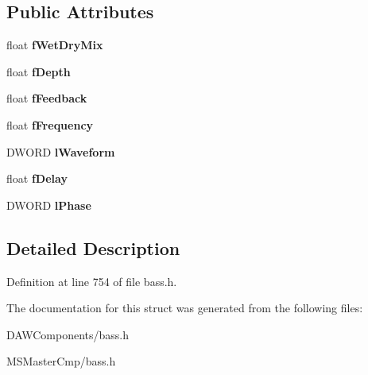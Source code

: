 \subsection*{Public Attributes}
\begin{DoxyCompactItemize}
\item 
\hypertarget{struct_b_a_s_s___d_x8___c_h_o_r_u_s_ade39ce1bf6ab4e1e4ae192491cf61dd9_ade39ce1bf6ab4e1e4ae192491cf61dd9}{float {\bfseries f\-Wet\-Dry\-Mix}}\label{struct_b_a_s_s___d_x8___c_h_o_r_u_s_ade39ce1bf6ab4e1e4ae192491cf61dd9_ade39ce1bf6ab4e1e4ae192491cf61dd9}

\item 
\hypertarget{struct_b_a_s_s___d_x8___c_h_o_r_u_s_a9255f6285c268622c30999d684e428f5_a9255f6285c268622c30999d684e428f5}{float {\bfseries f\-Depth}}\label{struct_b_a_s_s___d_x8___c_h_o_r_u_s_a9255f6285c268622c30999d684e428f5_a9255f6285c268622c30999d684e428f5}

\item 
\hypertarget{struct_b_a_s_s___d_x8___c_h_o_r_u_s_a3bbcdaa3f0e076111a62e6d9d10b77a8_a3bbcdaa3f0e076111a62e6d9d10b77a8}{float {\bfseries f\-Feedback}}\label{struct_b_a_s_s___d_x8___c_h_o_r_u_s_a3bbcdaa3f0e076111a62e6d9d10b77a8_a3bbcdaa3f0e076111a62e6d9d10b77a8}

\item 
\hypertarget{struct_b_a_s_s___d_x8___c_h_o_r_u_s_a6c28b947dcc6053c08694699625a705f_a6c28b947dcc6053c08694699625a705f}{float {\bfseries f\-Frequency}}\label{struct_b_a_s_s___d_x8___c_h_o_r_u_s_a6c28b947dcc6053c08694699625a705f_a6c28b947dcc6053c08694699625a705f}

\item 
\hypertarget{struct_b_a_s_s___d_x8___c_h_o_r_u_s_ada4ac1a08de4b20c7344d6a28d04a755_ada4ac1a08de4b20c7344d6a28d04a755}{D\-W\-O\-R\-D {\bfseries l\-Waveform}}\label{struct_b_a_s_s___d_x8___c_h_o_r_u_s_ada4ac1a08de4b20c7344d6a28d04a755_ada4ac1a08de4b20c7344d6a28d04a755}

\item 
\hypertarget{struct_b_a_s_s___d_x8___c_h_o_r_u_s_a009967698b28066520e72e3db35a57b3_a009967698b28066520e72e3db35a57b3}{float {\bfseries f\-Delay}}\label{struct_b_a_s_s___d_x8___c_h_o_r_u_s_a009967698b28066520e72e3db35a57b3_a009967698b28066520e72e3db35a57b3}

\item 
\hypertarget{struct_b_a_s_s___d_x8___c_h_o_r_u_s_a98b93f86df1f31303a62c5942ebe3c0e_a98b93f86df1f31303a62c5942ebe3c0e}{D\-W\-O\-R\-D {\bfseries l\-Phase}}\label{struct_b_a_s_s___d_x8___c_h_o_r_u_s_a98b93f86df1f31303a62c5942ebe3c0e_a98b93f86df1f31303a62c5942ebe3c0e}

\end{DoxyCompactItemize}


\subsection{Detailed Description}


Definition at line 754 of file bass.\-h.



The documentation for this struct was generated from the following files\-:\begin{DoxyCompactItemize}
\item 
D\-A\-W\-Components/bass.\-h\item 
M\-S\-Master\-Cmp/bass.\-h\end{DoxyCompactItemize}
